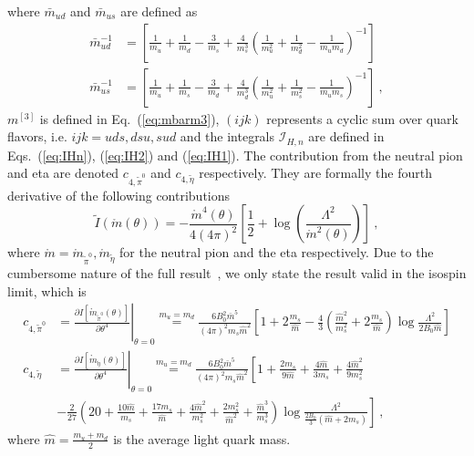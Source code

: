 \documentclass[12pt]{elsarticle}
\begin{document}
where $\bar{m}_{ud}$ and $\bar{m}_{us}$ are defined as
\begin{align}
\label{eq:mbud}
\bar{m}_{ud}^{-1}&=\left[\frac{1}{m_{u}}+\frac{1}{m_{d}}-\frac{3}{m_{s}}+\frac{4}{m_{s}^{3}}\left(\frac{1}{m_{u}^{2}}+\frac{1}{m_{d}^{2}}-\frac{1}{m_{u}m_{d}}\right)^{-1} \right]\\
\label{eq:mbus}
\bar{m}_{us}^{-1}&=\left[\frac{1}{m_{u}}+\frac{1}{m_{s}}-\frac{3}{m_{d}}+\frac{4}{m_{d}^{3}}\left(\frac{1}{m_{u}^{2}}+\frac{1}{m_{s}^{2}}-\frac{1}{m_{u}m_{s}}\right)^{-1} \right]\ ,
\end{align}
$m^{[3]}$ is defined in Eq.~(\ref{eq:mbarm3}), $(ijk)$ represents a cyclic sum over quark flavors, i.e. $ijk=uds,dsu,sud$ and the integrals $\mathcal{I}_{H,n}$ are defined in Eqs.~(\ref{eq:IHn}), (\ref{eq:IH2}) and (\ref{eq:IH1}). The contribution from the neutral pion and eta are denoted $c_{4,\tilde{\pi}^{0}}$ and $c_{4,\tilde{\eta}}$ respectively. They are formally the fourth derivative of the following contributions
\begin{equation}
\tilde{I}(\mathring{m}(\theta))=-\frac{\mathring{m}^{4}(\theta)}{4(4\pi)^{2}}\left [\frac{1}{2}+\log\left (\frac{\Lambda^{2}}{\mathring{m}^{2}(\theta)} \right ) \right ]\ ,
\end{equation}
where $\mathring{m}=\mathring{m}_{\tilde{\pi}^{0}},\mathring{m}_{\tilde{\eta}}$ for the neutral pion and the eta respectively. Due to the cumbersome nature of the full result~\cite{Bernard:2012fw,GomezNicola:2019myi}, we only state the result valid in the isospin limit, which is
\begin{align}
c_{4,\tilde{\pi}^{0}}&=\left.\frac{\partial I[\mathring{m}_{\tilde{\pi}^{0}}(\theta)]}{\partial\theta^{4}}\right |_{\theta=0}\overset{m_{u}=m_{d}}{=}\frac{6B_{0}^{2}\bar{m}^{5}}{(4\pi)^{2}m_{s}\hat{m}^{2}}\left[1+2\frac{m_{s}}{\hat{m}}-\frac{4}{3}\left(\frac{\hat{m}^{2}}{m_{s}^{2}}+2\frac{m_{s}}{\hat{m}}\right)\log\frac{\Lambda^{2}}{2B_{0}\hat{m}}\right]\\
\nonumber
c_{4,\tilde{\eta}}&=\left.\frac{\partial I[\mathring{m}_{\tilde{\eta}}(\theta)]}{\partial\theta^{4}}\right |_{\theta=0}\overset{m_{u}=m_{d}}{=}\frac{6B_{0}^{2}\bar{m}^{5}}{(4\pi)^{2}m_{s}\hat{m}^{2}}\left[1+\frac{2m_{s}}{9\hat{m}}+\frac{4\hat{m}}{3m_{s}}+\frac{4\hat{m}^{2}}{9m_{s}^{2}}\right.\\
&\left.-\frac{2}{27}\left(20+\frac{10\hat{m}}{m_{s}}+\frac{17m_{s}}{\hat{m}}+\frac{4\hat{m}^{2}}{m_{s}^{2}}+\frac{2m_{s}^{2}}{\hat{m}^{2}}+\frac{\hat{m}^{3}}{m_{s}^{3}}\right)\log\frac{\Lambda^{2}}{\tfrac{2B_{0}}{3}(\hat{m}+2m_{s})}\right]\ ,
\end{align}
where $\hat{m}=\frac{m_{u}+m_{d}}{2}$ is the average light quark mass.
\end{document}

